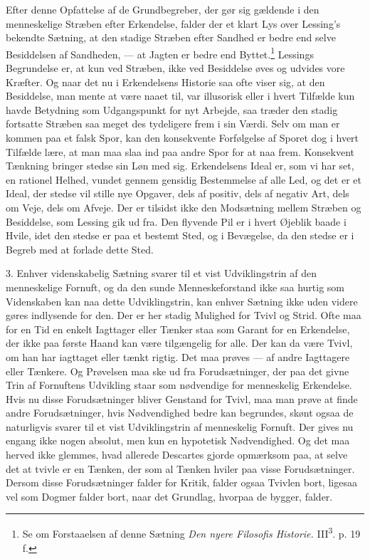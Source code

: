 \documentclass[12pt]{article}
\newcommand{\opage}[1]{\marginnote{\footnotesize\textit{[#1]}}}
\begin{document}
Efter denne Opfattelse af de Grundbegreber, der gør sig gældende i den
menneskelige Stræben efter Erkendelse, falder der et klart Lys over
Lessing's bekendte Sætning, at den stadige Stræben efter Sandhed er
bedre end selve Besiddelsen af Sandheden, --- at Jagten er bedre end
Byttet.\footnote{Se om Forstaaelsen af denne Sætning \textit{Den nyere
Filosofis Historie.} III\textsuperscript{3}. p. 19 f.} Lessings Begrundelse er, at kun ved Stræben, ikke ved
Besiddelse øves og udvides vore Kræfter. Og naar det nu i Erkendelsens
Historie saa ofte viser sig, at den Besiddelse, man mente at være naaet
til, var illusorisk eller i hvert Tilfælde kun havde Betydning som
Udgangspunkt for nyt Arbejde, saa træder den stadig fortsatte Stræben
\opage{16}saa meget des tydeligere frem i sin Værdi. Selv om man er kommen
paa et falsk Spor, kan den konsekvente Forfølgelse af Sporet dog i
hvert Tilfælde lære, at man maa slaa ind paa andre Spor for at naa
frem. Konsekvent Tænkning bringer stedse sin Løn med sig.
Erkendelsens Ideal er, som vi har set, en rationel Helhed, vundet
gennem gensidig Bestemmelse af alle Led, og det er et Ideal, der
stedse vil stille nye Opgaver, dels af positiv, dels af negativ Art,
dels om Veje, dels om Afveje. Der er tilsidst ikke den Modsætning
mellem Stræben og Besiddelse, som Lessing gik ud fra. Den flyvende Pil
er i hvert Øjeblik baade i Hvile, idet den stedse er paa et bestemt
Sted, og i Bevægelse, da den stedse er i Begreb med at forlade dette
Sted.

3. Enhver videnskabelig Sætning svarer til et vist Udviklingstrin af
den menneskelige Fornuft, og da den sunde Menneskeforstand ikke saa
hurtig som Videnskaben kan naa dette Udviklingstrin, kan enhver
Sætning ikke uden videre gøres indlysende for den. Der er her stadig
Mulighed for Tvivl og Strid. Ofte maa for en Tid en enkelt Iagttager
eller Tænker staa som Garant for en Erkendelse, der ikke paa første
Haand kan være tilgængelig for alle. Der kan da være Tvivl, om han har
iagttaget eller tænkt rigtig. Det maa prøves --- af andre Iagttagere
eller Tænkere. Og Prøvelsen maa ske ud fra Forudsætninger, der paa det
givne Trin af Fornuftens Udvikling staar som nødvendige for
menneskelig Erkendelse. Hvis nu disse Forudsætninger bliver Genstand
for Tvivl, maa man prøve at finde andre Forudsætninger, hvis
Nødvendighed bedre kan begrundes, skønt ogsaa de naturligvis svarer
til et vist Udviklingstrin af menneskelig Fornuft. Der gives nu engang
ikke nogen absolut, men kun en hypotetisk Nødvendighed. Og det maa
\setcounter{footnote}{0}%
\opage{17}herved ikke glemmes, hvad allerede Descartes gjorde opmærksom paa,
at selve det at tvivle er en Tænken, der som al Tænken hviler paa
visse Forudsætninger. Dersom disse Forudsætninger falder for Kritik,
falder ogsaa Tvivlen bort, ligesaa vel som Dogmer falder bort, naar det
Grundlag, hvorpaa de bygger, falder.
\end{document}
